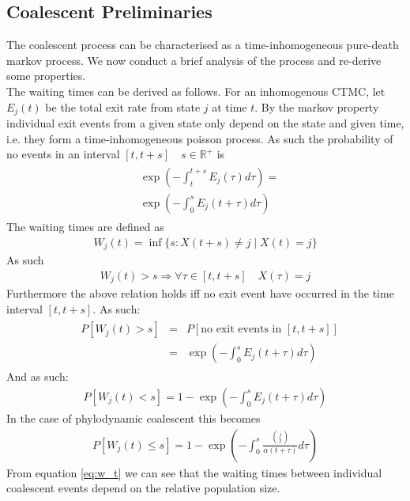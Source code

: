 \documentclass{ieeeaccess}
\newcommand{\R}{\mathbb{R}}
\theoremstyle{definition}
\begin{document}
\subsection{Coalescent Preliminaries}
The coalescent process can be characterised as a time-inhomogeneous pure-death markov process. We now conduct a brief analysis of the process and re-derive some properties.\\
The waiting times can be derived as follows.
For an inhomogenous CTMC, let $E_j(t)$ be the total exit rate from state $j$ at time $t$.
By the markov property individual exit events from a given state only depend on the state and given time, i.e. they form a time-inhomogeneous poisson process.
As such the probability of no events in an interval $[t,t+s]\quad s\in \R^+$ is 
\begin{gather}
\begin{aligned}
&\exp(-\int_t^{t+s}E_j(\tau)d\tau) =\\
&\exp(-\int_0^{s}E_j(t+\tau)d\tau)
\end{aligned}
\end{gather}
The waiting times are defined as
\begin{gather}
W_j(t) = \inf\{s:X(t+s)\neq j \mid X(t) = j\}
\end{gather}
As such
\begin{gather}
W_j(t) > s \Rightarrow \forall \tau\in[t, t+s]\quad X(\tau) = j
\end{gather}
Furthermore the above relation holds iff no exit event have occurred in the time interval $[t,t+s]$. As such:
\begin{gather}
\begin{aligned}
&P[W_j(t) > s] &=& P[\text{no exit events in }[t,t+s]]\\ 
&&=& \exp(-\int_0^{s}E_j(t+\tau)d\tau)
\end{aligned}
\end{gather}
And as such:
\begin{gather}
P[W_j(t) < s] = 1 - \exp(-\int_0^{s}E_j(t+\tau)d\tau)
\end{gather}
In the case of phylodynamic coalescent this becomes
\begin{gather}\label{eq:w_t}
P[W_j(t) \leq s] = 1 - \exp(-\int_0^{s}\frac{\binom{j}{2}}{\alpha(t+\tau)}d\tau)
\end{gather}
From equation \ref{eq:w_t} we can see that the waiting times between individual coalescent events depend on the relative population size.
\end{document}
